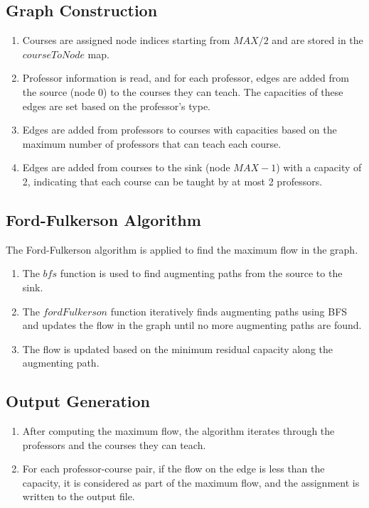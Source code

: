 \documentclass{article}
\begin{document}
\subsection*{Graph Construction}
\begin{enumerate}
    \item Courses are assigned node indices starting from \(MAX/2\) and are stored in the \(courseToNode\) map.
    \item Professor information is read, and for each professor, edges are added from the source (node 0) to the courses they can teach. The capacities of these edges are set based on the professor's type.
    \item Edges are added from professors to courses with capacities based on the maximum number of professors that can teach each course.
    \item Edges are added from courses to the sink (node \(MAX-1\)) with a capacity of 2, indicating that each course can be taught by at most 2 professors.
\end{enumerate}

\subsection*{Ford-Fulkerson Algorithm}
The Ford-Fulkerson algorithm is applied to find the maximum flow in the graph.
\begin{enumerate}
    \item The \(bfs\) function is used to find augmenting paths from the source to the sink.
    \item The \(fordFulkerson\) function iteratively finds augmenting paths using BFS and updates the flow in the graph until no more augmenting paths are found.
    \item The flow is updated based on the minimum residual capacity along the augmenting path.
\end{enumerate}

\subsection*{Output Generation}
\begin{enumerate}
    \item After computing the maximum flow, the algorithm iterates through the professors and the courses they can teach.
    \item For each professor-course pair, if the flow on the edge is less than the capacity, it is considered as part of the maximum flow, and the assignment is written to the output file.
\end{enumerate}
\end{document}
